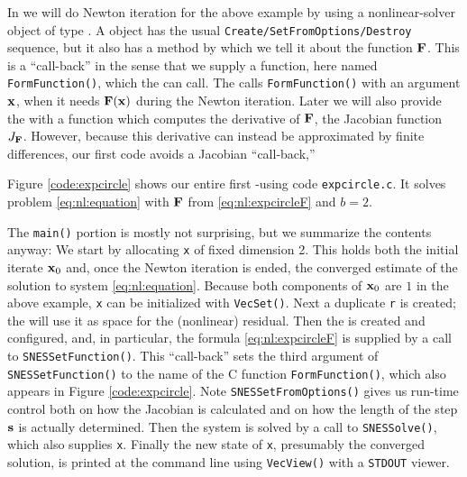 In \PETSc we will do Newton iteration for the above example by using a nonlinear-solver object of type \pSNES.  A \pSNES object has the usual \texttt{Create/SetFromOptions/Destroy} sequence, but it also has a method by which we tell it about the function $\mathbf{F}$.  This is a ``call-back'' in the sense that we supply a function, here named \texttt{FormFunction()}, which the \pSNES can call.  The \pSNES calls \texttt{FormFunction()} with an argument $\mathbf{x}$, when it needs $\mathbf{F}(\mathbf{x})$ during the Newton iteration.  Later we will also provide the \pSNES with a function which computes the derivative of $\mathbf{F}$, the Jacobian function $J_{\mathbf{F}}$.  However, because this derivative can instead be approximated by finite differences, our first code avoids a Jacobian ``call-back,''

Figure \ref{code:expcircle} shows our entire first \pSNES-using code \texttt{expcircle.c}.  It solves problem \eqref{eq:nl:equation} with $\mathbf{F}$ from \eqref{eq:nl:expcircleF} and $b=2$.

\vfill
{}

The \texttt{main()} portion is mostly not surprising, but we summarize the contents anyway:  We start by allocating \pVec \texttt{x} of fixed dimension 2.  This holds both the initial iterate $\mathbf{x}_0$ and, once the Newton iteration is ended, the converged estimate of the solution to system \eqref{eq:nl:equation}.  Because both components of $\mathbf{x}_0$ are $1$ in the above example, \pVec \texttt{x} can be initialized with \texttt{VecSet()}.  Next a duplicate \pVec \texttt{r} is created; the \pSNES will use it as space for the (nonlinear) residual.  Then the \pSNES is created and configured, and, in particular, the formula \eqref{eq:nl:expcircleF} is supplied by a call to \texttt{SNESSetFunction()}.  This ``call-back'' sets the third argument of \texttt{SNESSetFunction()} to the name of the C function \texttt{FormFunction()}, which also appears in Figure \ref{code:expcircle}.  Note \texttt{SNESSetFromOptions()} gives us run-time control both on how the Jacobian is calculated and on how the length of the step $\mathbf{s}$ is actually determined.  Then the system is solved by a call to \texttt{SNESSolve()}, which also supplies \pVec \texttt{x}.  Finally the new state of \texttt{x}, presumably the converged solution, is printed at the command line using \texttt{VecView()} with a \texttt{STDOUT} viewer.

